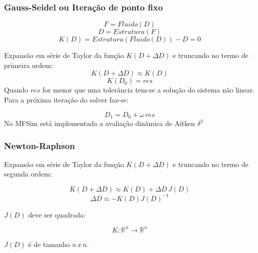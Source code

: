 \documentclass[xcolor=dvipsnames,10pt,aspectratio=169]{beamer}
\begin{document}
		
		\begin{frame}
			\frametitle{Gauss-Seidel ou Iteração de ponto fixo}
			\centering
		   \begin{equation}\label{forte_eq}
				F = Fluido(D)
			\end{equation}
		   \begin{equation}\label{forte_eq2}
				D = Estrutura(F)
			\end{equation}
		   \begin{equation}\label{forte_eq3}
			  K(D) =  Estrutura(Fluido(D))-D =  0
			\end{equation}
			
			\flushleft

			Expansão em série de Taylor da função $K(D+\Delta D)$ e truncando no termo de primeira ordem:
			\begin{equation}\label{forte_eq4}
			K(D+\Delta D) \approx K(D)
			\end{equation}
			\centering
			\begin{equation}\label{forte_eq5}
			K(D_0) = res
			\end{equation}
			\flushleft
			Quando $res$ for menor que uma tolerância tem-se a solução do sistema não linear. Para a próxima iteração do solver faz-se:
			
			\centering
			\begin{equation}\label{forte_eq6}
			D_1 = D_0 + \omega \, res
			\end{equation}
			\flushleft
			 No MFSim está implementada a avaliação dinâmica de Aitken $\delta^2$\\
			
		\end{frame}
	

		\begin{frame}
			\frametitle{Newton-Raphson}
			\flushleft
			Expansão em série de Taylor da função $K(D+\Delta D)$ e truncando no termo de segunda ordem:
			
			\centering
			\begin{equation}\label{forte_eq_Newton}
			K(D+\Delta D) \approx K(D)+\Delta D \, J(D)
			\end{equation}
			\begin{equation}\label{forte_eq_Newton2}
			\Delta D \approx -K(D)J(D)^{-1}
			\end{equation}
			
			\flushleft
			$J(D)$ deve ser quadrada:
			
			\centering
			\begin{equation}\label{forte_eq_Newton3}
			K: \mathbb{R}^{n} \to \mathbb{R}^{n}
			\end{equation}
			
			\flushleft
			$J(D)$ é de tamanho $n \, x \, n$.
		\end{frame}
		
\end{document}
